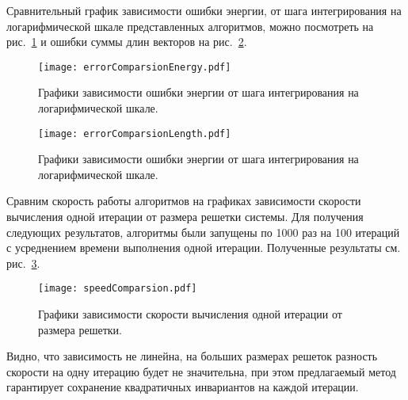 Сравнительный график зависимости ошибки энергии, от шага интегрирования на
логарифмической шкале представленных алгоритмов, можно посмотреть на
рис.~\ref{fig:error-comparsion-energy} и ошибки суммы длин векторов на
рис.~\ref{fig:error-comparsion-length}.
\begin{figure}[H]
    \centering
    \texttt{[image: errorComparsionEnergy.pdf]}
    \caption{Графики зависимости ошибки энергии от шага интегрирования на
    логарифмической шкале.}
\label{fig:error-comparsion-energy}
\end{figure}
\begin{figure}[H]
    \centering
    \texttt{[image: errorComparsionLength.pdf]}
    \caption{Графики зависимости ошибки энергии от шага интегрирования на
    логарифмической шкале.}
\label{fig:error-comparsion-length}
\end{figure}

Сравним скорость работы алгоритмов на графиках зависимости скорости вычисления
одной итерации от размера решетки системы. Для получения следующих результатов,
алгоритмы были запущены по 1000 раз на 100 итераций с усреднением времени
выполнения одной итерации. Полученные результаты см.
рис.~\ref{fig:benchmark-speed}.
\begin{figure}[H]
    \centering
    \texttt{[image: speedComparsion.pdf]}
    \caption{Графики зависимости скорости вычисления одной итерации от размера
    решетки.}
\label{fig:benchmark-speed}
\end{figure}
Видно, что зависимость не линейна, на больших размерах решеток разность
скорости на одну итерацию будет не значительна, при этом предлагаемый метод
гарантирует сохранение квадратичных инвариантов на каждой итерации.

